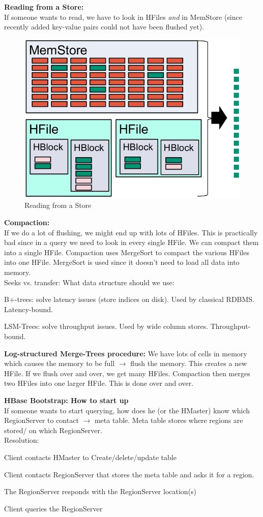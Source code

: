 \documentclass[11pt,oneside,a4paper]{article}
\begin{document}
\textbf{Reading from a Store:}\\
If someone wants to read, we have to look in HFiles \textit{and} in MemStore (since recently added key-value pairs could not have been flushed yet).

\begin{figure}[hb!]
	\centering
	\includegraphics[width=0.3\linewidth]{figures/hbase_read_store}
	\caption{Reading from a Store}
	\label{fig:hbasereadstore}
\end{figure}

\textbf{Compaction:}\\
If we do a lot of flushing, we might end up with lots of HFiles. This is practically bad since in a query we need to look in every single HFile. We can compact them into a single HFile. Compaction uses MergeSort to compact the various HFiles into one HFile. MergeSort is used since it doesn't need to load all data into memory.\\
Seeks vs. transfer: What data structure should we use:

\begin{compactitem}
	\item B+-trees: solve latency issues (store indices on disk). Used by classical RDBMS. Latency-bound.
	\item LSM-Trees: solve throughput issues. Used by wide column stores. Throughput-bound.
\end{compactitem}

\textbf{Log-structured Merge-Trees procedure:} We have lots of cells in memory which causes the memory to be full $\rightarrow$ flush the memory. This creates a new HFile. If we flush over and over, we get many HFiles. Compaction then merges two HFiles into one larger HFile. This is done over and over.

\textbf{HBase Bootstrap: How to start up}\\
If someone wants to start querying, how does he (or the HMaster) know which RegionServer to contact $\rightarrow$ meta table. Meta table stores where regions are stored/ on which RegionServer.\\
Resolution:

\begin{compactenum}
	\item Client contacts HMaster to Create/delete/update table
	\item Client contacts RegionServer that stores the meta table and asks it for a region.
	\item The RegionServer responds with the RegionServer location(s)
	\item Client queries the RegionServer
\end{compactenum}
\end{document}
